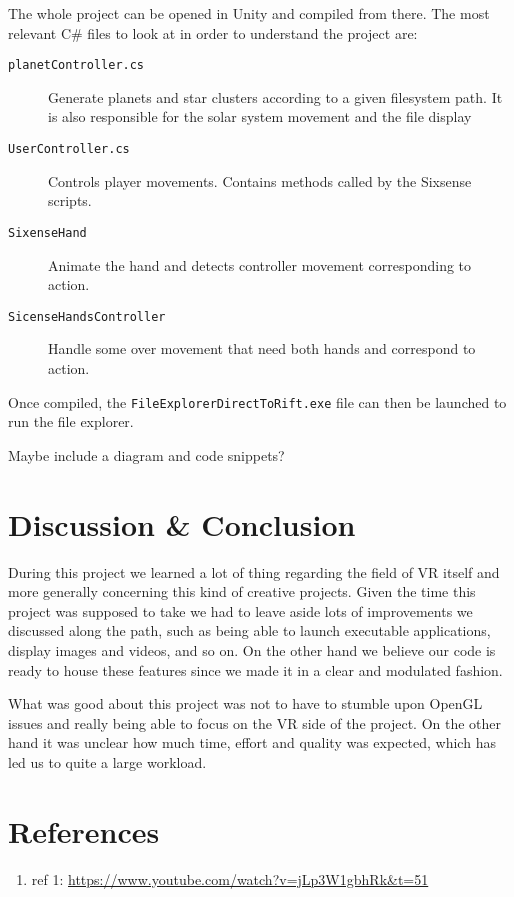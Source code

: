 \documentclass[paper=a4, fontsize=11pt]{scrartcl} %
\numberwithin{equation}{section} %
\numberwithin{figure}{section} %
\numberwithin{table}{section} %
\begin{document}
	
	The whole project can be opened in Unity and compiled from there. The most relevant C\# files to look at in order to understand the project are:
	\begin{description}
		\item[\texttt{planetController.cs}] Generate planets and star clusters according to a given filesystem path. It is also responsible for the solar system movement and the file display 
		\item[\texttt{UserController.cs}] Controls player movements. Contains methods called by the Sixsense scripts.
		\item[\texttt{SixenseHand}] Animate the hand and detects controller movement corresponding to action.
		\item[\texttt{SicenseHandsController}] Handle some over movement that need both hands and correspond to action.
	\end{description}
	
	Once compiled, the \texttt{FileExplorerDirectToRift.exe} file can then be launched to run the file explorer.
	
	Maybe include a diagram and code snippets?
	

\section{Discussion \& Conclusion}

During this project we learned a lot of thing regarding the field of VR itself and more generally concerning this kind of creative projects. Given the time this project was supposed to take we had to leave aside lots of improvements we discussed along the path, such as being able to launch executable applications, display images and videos, and so on. On the other hand we believe our code is ready to house these features since we made it in a clear and modulated fashion.

What was good about this project was not to have to stumble upon OpenGL issues and really being able to focus on the VR side of the project. On the other hand it was unclear how much time, effort and quality was expected, which has led us to quite a large workload.


\section{References}
\label{sec:refs}
\begin{enumerate}
\item ref 1: \url{https://www.youtube.com/watch?v=jLp3W1gbhRk&t=51}
\end{enumerate}

\end{document}
